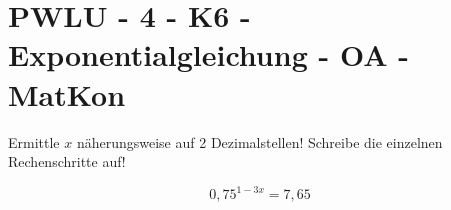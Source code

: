 \section{PWLU - 4 - K6 - Exponentialgleichung - OA - MatKon}

\begin{beispiel}[PWLU]{1}
Ermittle $x$ näherungsweise auf 2 Dezimalstellen! Schreibe die einzelnen Rechenschritte auf!

$$0,75^{1-3x}=7,65$$

\end{beispiel}